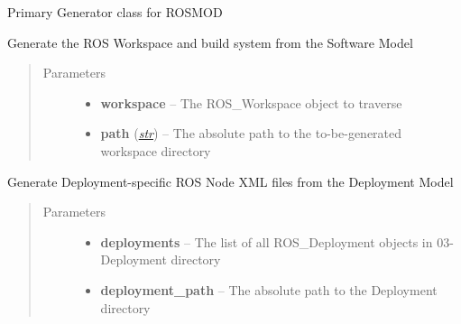 \documentclass[letterpaper,10pt,english]{sphinxmanual}
\begin{document}
\begin{fulllineitems}
\label{class_Generator:ROSMOD_Generator}
Primary Generator class for ROSMOD

\begin{fulllineitems}
\label{class_Generator:ROSMOD_Generator.generate_workspace}
Generate the ROS Workspace and build system from the Software Model
\begin{quote}\begin{description}
\item[{Parameters}] \leavevmode\begin{itemize}
\item {} 
\textbf{workspace} -- The ROS\_Workspace object to traverse

\item {} 
\textbf{path} (\href{http://docs.python.org/library/functions.html\#str}{\emph{str}}) -- The absolute path to the to-be-generated workspace directory

\end{itemize}

\end{description}\end{quote}

\end{fulllineitems}


\begin{fulllineitems}
\label{class_Generator:ROSMOD_Generator.generate_xml}
Generate Deployment-specific ROS Node XML files from the Deployment Model
\begin{quote}\begin{description}
\item[{Parameters}] \leavevmode\begin{itemize}
\item {} 
\textbf{deployments} -- The list of all ROS\_Deployment objects in 03-Deployment directory

\item {} 
\textbf{deployment\_path} -- The absolute path to the Deployment directory

\end{itemize}


\end{description}
\end{quote}
\end{fulllineitems}
\end{fulllineitems}
\end{document}
